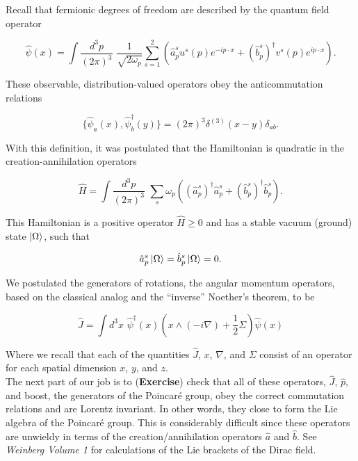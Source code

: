 
\noindent Recall that fermionic degrees of freedom are described by the quantum field operator

\begin{equation}
\hat{\psi} (x) = \int \frac{d^3 p}{(2 \pi)^3} \,\, \frac{1}{\sqrt{2 \omega_p}} \sum_{s=1}^2 \left( \hat{a}_p^s u^s(p) e^{-i p \cdot x} + (\hat{b}_{p}^s)^\dagger v^s(p) e^{i p \cdot x} \right).
\end{equation}

\noindent These observable, distribution-valued operators obey the anticommutation relations

\begin{equation}
\{ \hat{\psi}_a (x), \hat{\psi}_b^\dagger (y) \} = (2 \pi )^3 \delta^{(3)}(x-y) \delta_{ab}.
\end{equation}

\noindent With this definition, it was postulated that the Hamiltonian is quadratic in the creation-annihilation operators

\begin{equation}
\hat{H} = \int \frac{d^3 p}{(2 \pi)^3} \,\, \sum_s \omega_p \left( (\hat{a}_p^s)^\dagger \hat{a}_p^s + (\hat{b}_p^s)^\dagger \hat{b}_p^s \right).
\end{equation}

\noindent This Hamiltonian is a positive operator $\hat{H} \ge 0$ and has a stable vacuum (ground) state $\ket{\Omega}$, such that

\begin{equation}
\hat{a}_p^s \ket{\Omega} = \hat{b}_p^s \ket{\Omega} = 0.
\end{equation}

\noindent We postulated the generators of rotations, the angular momentum operators, based on the classical analog and the ``inverse'' Noether's theorem, to be

\begin{equation}
\hat{J} = \int d^3 x \,\, \hat{\psi}^\dagger (x) \left( x \wedge (-i \nabla) + \frac{1}{2} \Sigma \right) \hat{\psi} (x)
\end{equation}

\noindent Where we recall that each of the quantities $\hat{J}$, $x$, $\nabla$, and $\Sigma$ consist of an operator for each spatial dimension $x$, $y$, and $z$. \\

\noindent The next part of our job is to (\textbf{Exercise}) check that all of these operators, $\hat{J}$, $\hat{p}$, and boost, the generators of the Poincar\'e group, obey the correct commutation relations and are Lorentz invariant. In other words, they close to form the Lie algebra of the Poincar\'e group. This is considerably difficult since these operators are unwieldy in terms of the creation/annihilation operators $\hat{a}$ and $\hat{b}$. See \textit{Weinberg Volume 1} for calculations of the Lie brackets of the Dirac field. \\

